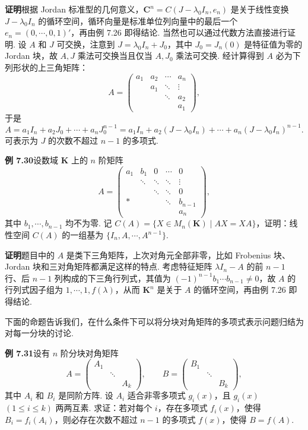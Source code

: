 \documentclass[UTF8, 12pt, fontset=fandol, oneside]{ctexart}
\begin{document}
\noindent\textbf{证明}\quad 根据 Jordan 标准型的几何意义，$\mathbf{C}^n=C(J-\lambda_0I_n,e_n)$ 是关于线性变换 $J-\lambda_0I_n$ 的循环空间，循环向量是标准单位列向量中的最后一个 $e_n=(0,\cdots,0,1)'$，再由例 7.26 即得结论. 当然也可以通过代数方法直接进行证明. 设 $A$ 和 $J$ 可交换，注意到 $J=\lambda_0I_n+J_0$，其中 $J_0=J_n(0)$ 是特征值为零的 Jordan 块，故 $A,J$ 乘法可交换当且仅当 $A,J_0$ 乘法可交换. 经计算得到 $A$ 必为下列形状的上三角矩阵：
\[
A=\left(\begin{array}{ccccc}
a_1 & a_2 & \cdots & a_n\\
    & a_1 & \ddots & \vdots\\
    &     & \ddots & a_2\\
    &     &        & a_1
\end{array}\right),
\]
于是
\[
A=a_1I_n+a_2J_0+\cdots+a_nJ_0^{n-1}
=a_1I_n+a_2(J-\lambda_0I_n)+\cdots+a_n(J-\lambda_0I_n)^{n-1}.
\]
可表示为 $J$ 的次数不超过 $n-1$ 的多项式.

\noindent\textbf{例 7.30}\quad 设数域 $\mathbf{K}$ 上的 $n$ 阶矩阵
\[
A=
\left(\begin{array}{ccccc}
a_1 & b_1 & 0 & \cdots & 0\\
    & \ddots & \ddots & \ddots & \vdots\\
    &        & \ddots & \ddots & 0\\
*   &        &        & \ddots & b_{n-1}\\
    &        &        &        & a_n
\end{array}\right),
\]
其中 $b_1,\cdots,b_{n-1}$ 均不为零. 记 $C(A)=\{X\in M_n(\mathbf{K})\mid AX=XA\}$，证明：线性空间 $C(A)$ 的一组基为 $\{I_n,A,\cdots,A^{n-1}\}$.

\noindent\textbf{证明}\quad 题目中的 $A$ 是类下三角矩阵，上次对角元全部非零，比如 Frobenius 块、Jordan 块和三对角矩阵都满足这样的特点. 考虑特征矩阵 $\lambda I_n-A$ 的前 $n-1$ 行、后 $n-1$ 列构成的下三角行列式，其值为 $(-1)^{n-1}b_1\cdots b_{n-1}\ne 0$，故 $A$ 的行列式因子组为 $1,\cdots,1,f(\lambda)$，从而 $\mathbf{K}^n$ 是关于 $A$ 的循环空间，再由例 7.26 即得结论.

下面的命题告诉我们，在什么条件下可以将分块对角矩阵的多项式表示问题归结为对每一分块的讨论.

\noindent\textbf{例 7.31}\quad 设有 $n$ 阶分块对角矩阵
\[
A=\left(\begin{array}{ccc}
A_1 &        &  \\
    & \ddots &  \\
    &        & A_k
\end{array}\right),\qquad
B=\left(\begin{array}{ccc}
B_1 &        &  \\
    & \ddots &  \\
    &        & B_k
\end{array}\right),
\]
其中 $A_i$ 和 $B_i$ 是同阶方阵. 设 $A_i$ 适合非零多项式 $g_i(x)$，且 $g_i(x)$ $(1\le i\le k)$ 两两互素. 求证：若对每个 $i$，存在多项式 $f_i(x)$，使得 $B_i=f_i(A_i)$，则必存在次数不超过 $n-1$ 的多项式 $f(x)$，使得 $B=f(A)$.
\end{document}
